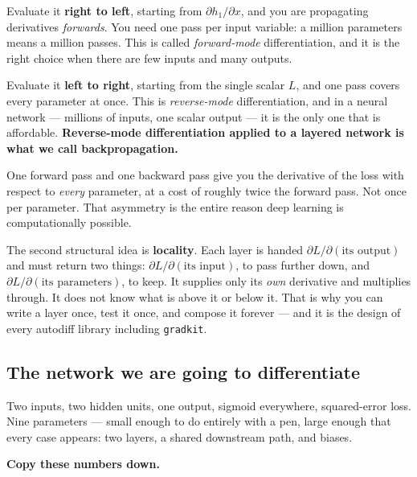 \documentclass[11pt]{article}
\begin{document}
Evaluate it \textbf{right to left}, starting from $\partial h_1/\partial x$,
and you are propagating derivatives \emph{forwards}. You need one pass per
input variable: a million parameters means a million passes. This is called
\emph{forward-mode} differentiation, and it is the right choice when there are
few inputs and many outputs.

Evaluate it \textbf{left to right}, starting from the single scalar $L$, and
one pass covers every parameter at once. This is \emph{reverse-mode}
differentiation, and in a neural network --- millions of inputs, one scalar
output --- it is the only one that is affordable. \textbf{Reverse-mode
differentiation applied to a layered network is what we call
backpropagation.}

\begin{keyidea}
One forward pass and one backward pass give you the derivative of the loss
with respect to \emph{every} parameter, at a cost of roughly twice the forward
pass. Not once per parameter. That asymmetry is the entire reason deep
learning is computationally possible.
\end{keyidea}

The second structural idea is \textbf{locality}. Each layer is handed
$\partial L / \partial(\text{its output})$ and must return two things:
$\partial L / \partial(\text{its input})$, to pass further down, and
$\partial L / \partial(\text{its parameters})$, to keep. It supplies only its
\emph{own} derivative and multiplies through. It does not know what is above
it or below it. That is why you can write a layer once, test it once, and
compose it forever --- and it is the design of every autodiff library
including \texttt{gradkit}.

\subsection{The network we are going to differentiate}
\label{sec:tinynet}

Two inputs, two hidden units, one output, sigmoid everywhere, squared-error
loss. Nine parameters --- small enough to do entirely with a pen, large enough
that every case appears: two layers, a shared downstream path, and biases.

\textbf{Copy these numbers down.}
\end{document}
